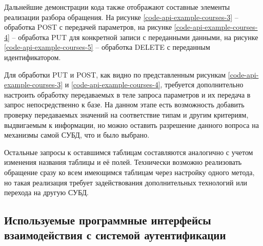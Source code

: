 

Дальнейшие демонстрации кода также отображают составные элементы реализации разбора обращения.
На рисунке \ref{code-api-example-courses-3} -- обработка POST с передачей параметров, на рисунке \ref{code-api-example-courses-4} -- обработка PUT для конкретной записи с переданными данными,
на рисунке \ref{code-api-example-courses-5} -- обработка DELETE с переданным идентификатором.



Для обработки PUT и POST, как видно по представленным рисункам \ref{code-api-example-courses-3} и \ref{code-api-example-courses-4}, требуется дополнительно настроить обработку передаваемых в теле запроса параметров и их передача в запрос непосредственно к базе.
На данном этапе есть возможность добавить проверку передаваемых значений на соответствие типам и другим критериям, выдвигаемым к информации, но можно оставить разрешение данного вопроса на механизмы самой СУБД, что и было выбрано.


Остальные запросы к оставшимся таблицам составляются аналогично с учетом изменения названия таблицы и её полей.
Технически возможно реализовать обращение сразу ко всем имеющимся таблицам через настройку одного метода, но такая реализация требует задействования дополнительных технологий или перехода на другую СУБД.


\subsection{Используемые программные интерфейсы взаимодействия с системой аутентификации}

